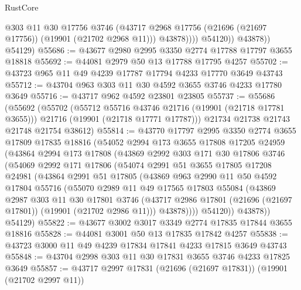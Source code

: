 \begin{lexlean}{RustCore}
\begin{coremodule}
                      @303
                      @11
                      @30
                      @17756
                      @3746
                      (@43717 @2968 @17756 (@21696 (@21697 @17756)) (@19901 (@21702 @2968 @11)))
                      @43878))))
              @54120))
          @43878))
      @54129)
@55686 := @43677 @2980 @2995 @3350 @2774 @17788 @17797 @3655 @18818
@55692 := @44081 @2979 @50 @13 @17788 @17795 @4257
@55702 := @43723 @965 @11 @49 @4239 @17787 @17794 @4233 @17770 @3649 @43743
@55712 := @43704 @963 @303 @11 @30 @4592 @3655 @3746 @4233 @17780 @3649
@55716 := @43717 @962 @4592 @23801 @23805
@55737 := @55686
    (@55692
      (@55702
        (@55712 @55716 @43746 @21716 (@19901 (@21718 @17781 @3655)))
        @21716
        (@19901 (@21718 @17771 @17787)))
      @21734
      @21738
      @21743
      @21748
      @21754
      @38612)
@55814 := @43770
    @17797
    @2995
    @3350
    @2774
    @3655
    @17809
    @17835
    @18816
    (@54052
      @2994
      @173
      @3655
      @17808
      @17205
      @24959
      (@43864
        @2994
        @173
        @17808
        (@43869
          @2992
          @303
          @171
          @30
          @17806
          @3746
          (@54069
            @2992
            @171
            @17806
            (@54074
              @2991
              @51
              @3655
              @17805
              @17208
              @24981
              (@43864
                @2991
                @51
                @17805
                (@43869
                  @963
                  @2990
                  @11
                  @50
                  @4592
                  @17804
                  @55716
                  (@55070
                    @2989
                    @11
                    @49
                    @17565
                    @17803
                    @55084
                    (@43869
                      @2987
                      @303
                      @11
                      @30
                      @17801
                      @3746
                      (@43717 @2986 @17801 (@21696 (@21697 @17801)) (@19901 (@21702 @2986 @11)))
                      @43878))))
              @54120))
          @43878))
      @54129)
@55822 := @43677 @3002 @3017 @3349 @2774 @17835 @17844 @3655 @18816
@55828 := @44081 @3001 @50 @13 @17835 @17842 @4257
@55838 := @43723 @3000 @11 @49 @4239 @17834 @17841 @4233 @17815 @3649 @43743
@55848 := @43704 @2998 @303 @11 @30 @17831 @3655 @3746 @4233 @17825 @3649
@55857 := @43717 @2997 @17831 (@21696 (@21697 @17831)) (@19901 (@21702 @2997 @11))

\end{coremodule}
\end{lexlean}
